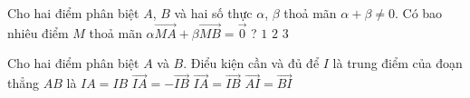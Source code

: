 \begin{ex}%
	Cho hai điểm phân biệt $A$, $B$ và hai số thực $\alpha$, $\beta$ thoả mãn $\alpha+\beta\ne 0$. Có bao nhiêu điểm $M$ thoả mãn $\alpha \overrightarrow{MA}+\beta \overrightarrow{MB}=\overrightarrow{0}$ ?
	{\True $1$}
	{$2$}
	{$3$}
\end{ex}

\begin{ex}%
	Cho hai điểm phân biệt $A$ và $B$. Điểu kiện cần và đủ để $I$ là trung điểm của đoạn thẳng $AB$ là
	\choice
	{$IA=IB$}
	{\True $\overrightarrow{IA}=-\overrightarrow{IB}$}
	{$\overrightarrow{IA}=\overrightarrow{IB}$}
	{$\overrightarrow{AI}=\overrightarrow{BI}$}
\end{ex}

